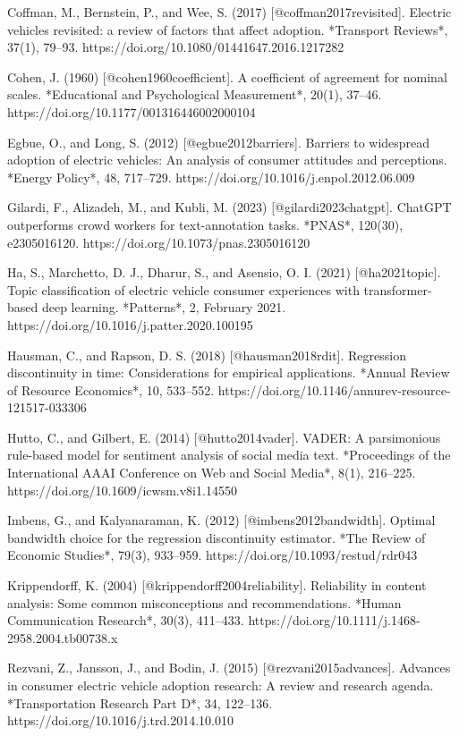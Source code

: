 \documentclass[11pt]{article}
\begin{document}
Coffman, M., Bernstein, P., and Wee, S. (2017) [@coffman2017revisited]. Electric vehicles revisited: a review of factors that affect adoption. *Transport Reviews*, 37(1), 79–93. https://doi.org/10.1080/01441647.2016.1217282


Cohen, J. (1960) [@cohen1960coefficient]. A coefficient of agreement for nominal scales. *Educational and Psychological Measurement*, 20(1), 37–46. https://doi.org/10.1177/001316446002000104


Egbue, O., and Long, S. (2012) [@egbue2012barriers]. Barriers to widespread adoption of electric vehicles: An analysis of consumer attitudes and perceptions. *Energy Policy*, 48, 717–729. https://doi.org/10.1016/j.enpol.2012.06.009


Gilardi, F., Alizadeh, M., and Kubli, M. (2023) [@gilardi2023chatgpt]. ChatGPT outperforms crowd workers for text-annotation tasks. *PNAS*, 120(30), e2305016120. https://doi.org/10.1073/pnas.2305016120


Ha, S., Marchetto, D. J., Dharur, S., and Asensio, O. I. (2021) [@ha2021topic]. Topic classification of electric vehicle consumer experiences with transformer-based deep learning. *Patterns*, 2, February 2021. https://doi.org/10.1016/j.patter.2020.100195


Hausman, C., and Rapson, D. S. (2018) [@hausman2018rdit]. Regression discontinuity in time: Considerations for empirical applications. *Annual Review of Resource Economics*, 10, 533–552. https://doi.org/10.1146/annurev-resource-121517-033306


Hutto, C., and Gilbert, E. (2014) [@hutto2014vader]. VADER: A parsimonious rule-based model for sentiment analysis of social media text. *Proceedings of the International AAAI Conference on Web and Social Media*, 8(1), 216–225. https://doi.org/10.1609/icwsm.v8i1.14550


Imbens, G., and Kalyanaraman, K. (2012) [@imbens2012bandwidth]. Optimal bandwidth choice for the regression discontinuity estimator. *The Review of Economic Studies*, 79(3), 933–959. https://doi.org/10.1093/restud/rdr043


Krippendorff, K. (2004) [@krippendorff2004reliability]. Reliability in content analysis: Some common misconceptions and recommendations. *Human Communication Research*, 30(3), 411–433. https://doi.org/10.1111/j.1468-2958.2004.tb00738.x


Rezvani, Z., Jansson, J., and Bodin, J. (2015) [@rezvani2015advances]. Advances in consumer electric vehicle adoption research: A review and research agenda. *Transportation Research Part D*, 34, 122–136. https://doi.org/10.1016/j.trd.2014.10.010
\end{document}
